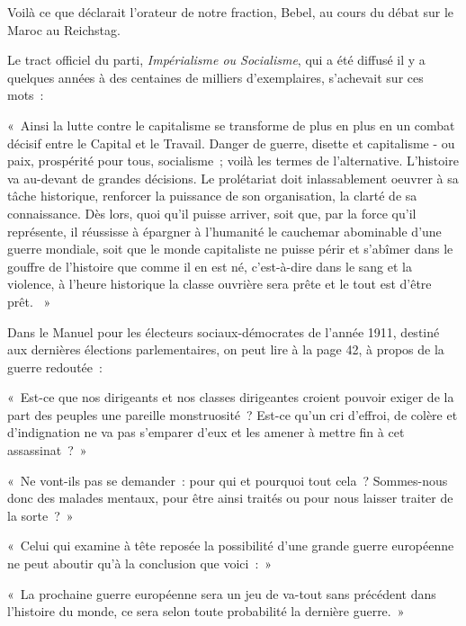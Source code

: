 \documentclass[french,twoside]{book} %
\newenvironment{quoteblock}%
  {\begin{quoting}}
  {\end{quoting}}
\newenvironment{quotebar}{%
    \def\FrameCommand{{\color{rubric!10!}\vrule width 0.5em} \hspace{0.9em}}%
    \def\OuterFrameSep{\itemsep} %
    \MakeFramed {\advance\hsize-\width \FrameRestore}
  }%
  {%
    \endMakeFramed
  }
\renewenvironment{quoteblock}%
  {%
    \savenotes
    \setstretch{0.9}
    \normalfont
    \begin{quotebar}
  }
  {%
    \end{quotebar}
    \spewnotes
  }
\begin{document}
\noindent Voilà ce que déclarait l’orateur de notre fraction, Bebel, au cours du débat sur le Maroc au Reichstag.\par
Le tract officiel du parti, \emph{Impérialisme ou Socialisme}, qui a été diffusé il y a quelques années à des centaines de milliers d’exemplaires, s’achevait sur ces mots :\par

\begin{quoteblock}
 \noindent « Ainsi la lutte contre le capitalisme se transforme de plus en plus en un combat décisif entre le Capital et le Travail. Danger de guerre, disette et capitalisme - ou paix, prospérité pour tous, socialisme ; voilà les termes de l’alternative. L'histoire va au-devant de grandes décisions. Le prolétariat doit inlassablement oeuvrer à sa tâche historique, renforcer la puissance de son organisation, la clarté de sa connaissance. Dès lors, quoi qu’il puisse arriver, soit que, par la  force qu’il représente, il réussisse à épargner à l’humanité le cauchemar abominable d’une guerre mondiale, soit que le monde capitaliste ne puisse périr et s’abîmer dans le gouffre de l’histoire que comme il en est né, c’est-à-dire dans le sang et la violence, à l’heure historique la classe ouvrière sera prête et le tout est d’être prêt.  »
\end{quoteblock}

\noindent Dans le Manuel pour les électeurs sociaux-démocrates de l’année 1911, destiné aux dernières élections parlementaires, on peut lire à la page 42, à propos de la guerre redoutée :\par

\begin{quoteblock}
 \noindent « Est-ce que nos dirigeants et nos classes dirigeantes croient pouvoir exiger de la part des peuples une pareille monstruosité ? Est-ce qu’un cri d’effroi, de colère et d’indignation ne va pas s’emparer d’eux et les amener à mettre fin à cet assassinat ? »\par
 « Ne vont-ils pas se demander : pour qui et pourquoi tout cela ? Sommes-nous donc des malades mentaux, pour être ainsi traités ou pour nous laisser traiter de la sorte ? »\par
 « Celui qui examine à tête reposée la possibilité d’une grande guerre européenne ne peut aboutir qu’à la conclusion que voici : »\par
 « La prochaine guerre européenne sera un jeu de va-tout sans précédent dans l’histoire du monde, ce sera selon toute probabilité la dernière guerre. »
\end{quoteblock}
\end{document}
